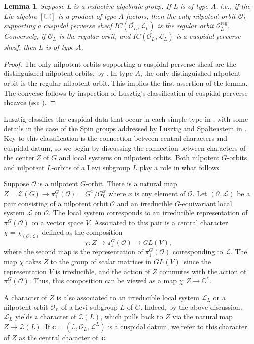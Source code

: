 \documentclass[reqno,11pt]{amsart}
\newtheorem{Lem}[Thm]{Lemma}
\theoremstyle{remark}
\theoremstyle{remark}
\theoremstyle{definition}
\theoremstyle{definition}
\theoremstyle{definition}
\numberwithin{equation}{section}
\newcommand{\C}{\mathbb{C}}           %
\newcommand{\fl}{{\mathfrak l}}
\newcommand{\cl}{\mathcal{L}}
\newcommand{\co}{\mathcal{O}}
\newcommand{\cz}{\mathcal{Z}}
\newcommand{\vc}{\mathbf{c}}
\newcommand{\reg}{\mathrm{reg}}
\begin{document}
\begin{Lem} \label{l:typeAcuspidal}
Suppose $L$ is a reductive algebraic group.  If $L$ is of type $A$, i.e., if the Lie algebra $[\fl, \fl]$ is a product of type $A$ factors, then the 
only nilpotent orbit $\co_L$ supporting a cuspidal perverse sheaf $IC(\overline{\co_L}, \cl_L)$ is the regular orbit $\co_L^{\reg}$.   Conversely, if $\co_L$ is the regular 
orbit, and $IC(\overline{\co_L}, \cl_L)$ is a cuspidal perverse
sheaf, then $L$ is of type
$A$.
\end{Lem}

\begin{proof}
The only nilpotent orbits supporting a cuspidal perverse sheaf are the distinguished nilpotent orbits, by \cite[Prop.~2.6]{AHJR17a}.  In type $A$, the only distinguished nilpotent orbit is the regular nilpotent orbit.  This implies the first assertion of the lemma.  The converse follows by inspection of Lusztig's classification of cuspidal perverse sheaves (see \cite{Lu84}).
\end{proof}


Lusztig classifies the cuspidal data that occur in each simple type in \cite{Lu84}, with some details in the case of the Spin groups addressed by Lusztig and Spaltenstein in \cite{LuSpal85}.   Key to this classification is the connection between central characters and cuspidal datum, so
we begin by discussing the connection between characters of the center $Z$ of $G$ and local systems on nilpotent orbits.  Both nilpotent $G$-orbits and nilpotent $L$-orbits of a Levi subgroup $L$ play a role in what follows.

Suppose $\co$ is a nilpotent $G$-orbit.  There is a natural map $Z = \cz(G) \to \pi_1^G(\co) = G^x/G^x_0$ where
$x$ is any element of $\co$. Let $(\co, \cl)$ be a pair consisting of a nilpotent orbit $\co$ and an irreducible $G$-equivariant local system $\cl$ on $\co$.
The local system corresponds to an irreducible representation of $\pi_1^G(\co) $ on a vector space $V$.
Associated to this pair is a central character $\chi = \chi_{(\co, \cl)}$ defined as the composition 
$$
\chi: Z \to \pi_1^G(\co) \to GL(V),
$$
where the second map is the representation of $\pi_1^G(\co)$ corresponding to $\cl$.  The map $\chi$ takes $Z$ to the group of
scalar matrices in $GL(V)$, since the representation $V$ is irreducible, and the action of $Z$ commutes with the action of
$\pi_1^G(\co)$.  Thus, this composition can be viewed as a map $\chi: Z \to \C^*$.

A character of $Z$ is also associated to an irreducible local system $\cl_L$ on a nilpotent orbit $\co_L$ of a Levi subgroup $L$ of $G$.
Indeed, by the above discussion, $\cl_L$ yields a character of $\cz(L)$, which pulls back to $Z$ via the natural map $Z\rightarrow \cz(L)$.  
If $\vc = (L, \co_L, \cl^L)$ is a cuspidal datum, we refer to this character of $Z$ as the central character of~$\vc$.
\end{document}
